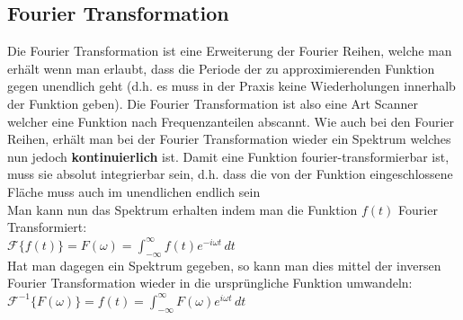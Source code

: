 \documentclass[12pt,a4paper]{article}
\newcommand{\nl}{\\[0.1cm]}
\begin{document}
\subsection{Fourier Transformation}
Die Fourier Transformation ist eine Erweiterung der Fourier Reihen, welche man erhält wenn man erlaubt, dass die Periode der zu approximierenden Funktion gegen unendlich geht (d.h. es muss in der Praxis keine Wiederholungen innerhalb der Funktion geben). Die Fourier Transformation ist also eine Art Scanner welcher eine Funktion nach Frequenzanteilen abscannt. Wie auch bei den Fourier Reihen, erhält man bei der Fourier Transformation wieder ein Spektrum welches nun jedoch \textbf{kontinuierlich} ist.
Damit eine Funktion fourier-transformierbar ist, muss sie absolut integrierbar sein, d.h. dass die von der Funktion eingeschlossene Fläche muss auch im unendlichen endlich sein\nl
Man kann nun das Spektrum erhalten indem man die Funktion $f(t)$ Fourier Transformiert:\nl
$\displaystyle \mathcal{F}\{f(t)\} = F(\omega) = \int_{-\infty}^\infty f(t)e^{-i\omega t}\,dt$\nl
Hat man dagegen ein Spektrum gegeben, so kann man dies mittel der inversen Fourier Transformation wieder in die ursprüngliche Funktion umwandeln:\nl
$\displaystyle \mathcal{F}^{-1}\{F(\omega)\} = f(t) = \int_{-\infty}^\infty F(\omega) e^{i\omega t}\,dt$\nl
\end{document}
